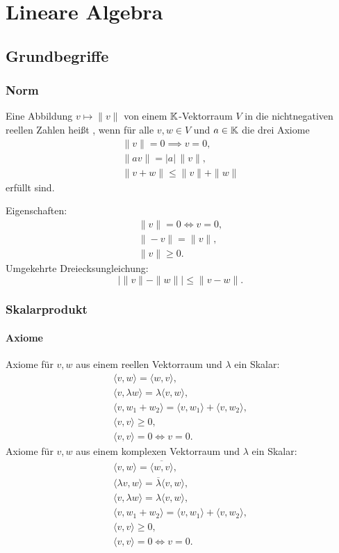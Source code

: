 
\chapter{Lineare Algebra}
\section{Grundbegriffe}
\subsection{Norm}
 Eine Abbildung $v\mapsto\|v\|$ von einem
$\mathbb K$-Vektorraum $V$ in die nichtnegativen reellen Zahlen heißt
, wenn für alle $v,w\in V$ und $a\in\mathbb K$
die drei Axiome%
\begin{gather}
\|v\|=0 \implies v=0,\\
\|av\| = |a|\,\|v\|,\\
\|v+w\| \le \|v\|+\|w\|
\end{gather}
erfüllt sind.

Eigenschaften:
\begin{gather}
\|v\|=0\iff v=0,\\
\|-v\|=\|v\|,\\
\|v\|\ge 0.
\end{gather}
Umgekehrte Dreiecksungleichung:
\begin{equation}
|\|v\|-\|w\||\le \|v-w\|.
\end{equation}

\subsection{Skalarprodukt}
\subsubsection{Axiome}
Axiome für $v,w$ aus einem reellen Vektorraum und $\lambda$ ein Skalar:
\begin{gather}
\langle v,w\rangle = \langle w,v\rangle,\\
\langle v,\lambda w\rangle = \lambda\langle v,w\rangle,\\
\langle v,w_1+w_2\rangle = \langle v,w_1\rangle +\langle v,w_2\rangle,\\
\langle v,v\rangle\ge 0,\\
\langle v,v\rangle=0 \iff v=0.
\end{gather}
Axiome für $v,w$ aus einem komplexen Vektorraum und $\lambda$ ein Skalar:
\begin{gather}
\langle v,w\rangle = \overline{\langle w,v\rangle},\\
\langle \lambda v,w\rangle = \overline{\lambda}\langle v,w\rangle,\\
\langle v,\lambda w\rangle = \lambda\langle v,w\rangle,\\
\langle v,w_1+w_2\rangle = \langle v,w_1\rangle +\langle v,w_2\rangle,\\
\langle v,v\rangle\ge 0,\\
\langle v,v\rangle=0 \iff v=0.
\end{gather}

